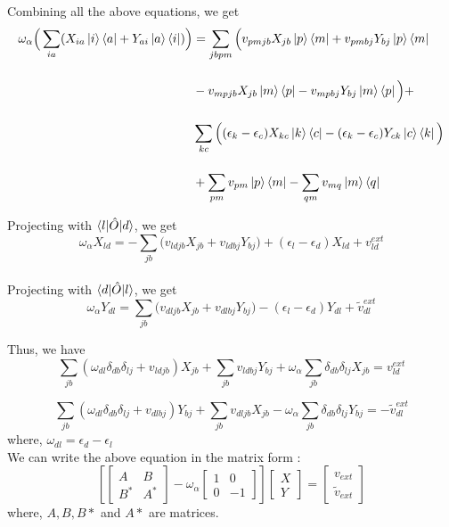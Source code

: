 \documentclass[12pt]{article}
\begin{document}
Combining all the above equations, we get
\begin{align*}
\omega_\alpha \Big( \sum_{ia} (X_{ia} \ket{i}\bra{a} + Y_{ai} \ket{a}\bra{i}) \Big) &=  \sum_{jbpm} 
\Big( v_{pmjb} X_{jb} \ket{p} \bra{m} + v_{pmbj} Y_{bj} \ket{p}\bra{m} \\[12pt]
     &- v_{mpjb} X_{jb} \ket{m}\bra{p} - v_{mpbj} Y_{bj} \ket{m}\bra{p} \Big) + \\[12pt] 
     &\sum_{kc} \Big( (\epsilon_k - \epsilon_c) X_{kc} \ket{k} \bra{c} - (\epsilon_k - \epsilon_c) 
     Y_{ck} \ket{c}\bra{k} \Big) \\[12pt]
     &+ \sum_{pm} v_{pm} \ket{p}\bra{m} - \sum_{qm} v_{mq} \ket{m}\bra{q}
\end{align*}

Projecting with $\braket{l|\hat{O}|d}$, we get
\[ \omega_\alpha X_{ld} = - \sum_{jb} \Big( v_{ldjb} X_{jb} + v_{ldbj} Y_{bj} \Big) 
    + (\epsilon_l - \epsilon_d) X_{ld}  + v_{ld}^{ext}\]
\\
Projecting with $\braket{d|\hat{O}|l}$, we get
\[ \omega_\alpha Y_{dl} = \sum_{jb} \Big( v_{dljb} X_{jb} + v_{dlbj} Y_{bj} \Big) 
    - (\epsilon_l - \epsilon_d) Y_{dl} + \tilde{v}_{dl}^{ext} \]

Thus, we have
\[ \sum_{jb} (\omega_{dl} \delta_{db} \delta_{lj} + v_{ldjb}) X_{jb} + \sum_{jb} v_{ldbj} Y_{bj} + 
\omega_\alpha \sum_{jb} \delta_{db} \delta_{lj} X_{jb} =  v_{ld}^{ext}\]

\[ \sum_{jb} (\omega_{dl} \delta_{db} \delta_{lj} + v_{dlbj}) Y_{bj} + \sum_{jb} v_{dljb} X_{jb} - 
\omega_\alpha \sum_{jb} \delta_{db} \delta_{lj} Y_{bj} = -\tilde{v}_{dl}^{ext} \]
where, $\omega_{dl} = \epsilon_d - \epsilon_l$
\\
We can write the above equation in the matrix form : 
\[
\left[
\begin{bmatrix}
    A & B \\
    B^* & A^*
\end{bmatrix}
- \omega_\alpha
\begin{bmatrix}
    1 & 0 \\
    0 & -1
\end{bmatrix}
\right]
\begin{bmatrix}
    X \\
    Y
\end{bmatrix}
=
\begin{bmatrix}
    v_{ext} \\
    \tilde{v}_{ext}
\end{bmatrix}
\]
where, $A,B,B*$ and $A*$ are matrices.
\end{document}
